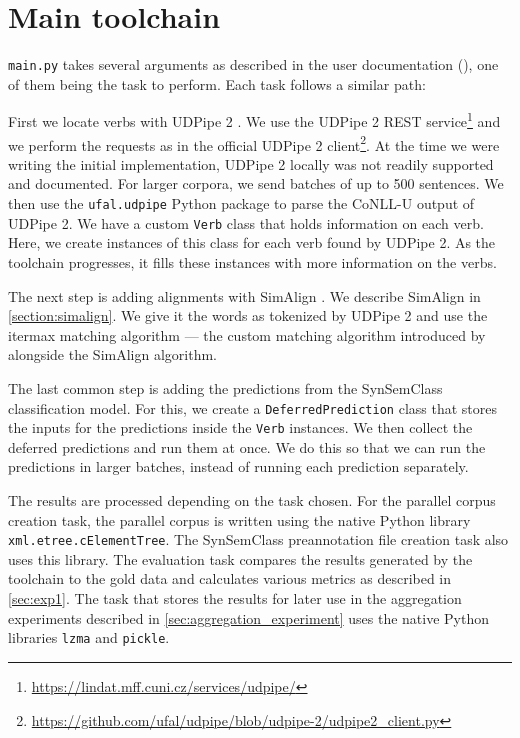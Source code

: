 \section{Main toolchain}

\texttt{main.py} takes several arguments as described in the user documentation (), one of them being the task to perform. Each task follows a similar path:

First we locate verbs with UDPipe 2 \parencite{straka-2018-udpipe}. We use the UDPipe 2 REST service\footnote{\url{https://lindat.mff.cuni.cz/services/udpipe/}} and we perform the requests as in the official UDPipe 2 client\footnote{\url{https://github.com/ufal/udpipe/blob/udpipe-2/udpipe2_client.py}}. At the time we were writing the initial implementation, UDPipe 2 locally was not readily supported and documented. For larger corpora, we send batches of up to 500 sentences. We then use the \texttt{ufal.udpipe} Python package to parse the CoNLL-U output of UDPipe 2. We have a custom \texttt{Verb} class that holds information on each verb. Here, we create instances of this class for each verb found by UDPipe 2. As the toolchain progresses, it fills these instances with more information on the verbs.

The next step is adding alignments with SimAlign \parencite{jalili-sabet-etal-2020-simalign}. We describe SimAlign in \cref{section:simalign}. We give it the words as tokenized by UDPipe 2 and use the itermax matching algorithm --- the custom matching algorithm introduced by \citet{jalili-sabet-etal-2020-simalign} alongside the SimAlign algorithm.

The last common step is adding the predictions from the SynSemClass classification model. For this, we create a \texttt{DeferredPrediction} class that stores the inputs for the predictions inside the \texttt{Verb} instances. We then collect the deferred predictions and run them at once. We do this so that we can run the predictions in larger batches, instead of running each prediction separately.

The results are processed depending on the task chosen. For the parallel corpus creation task, the parallel corpus is written using the native Python library \texttt{xml.etree.cElementTree}. The SynSemClass preannotation file creation task also uses this library. The evaluation task compares the results generated by the toolchain to the gold data and calculates various metrics as described in \cref{sec:exp1}. The task that stores the results for later use in the aggregation experiments described in \cref{sec:aggregation_experiment} uses the native Python libraries \texttt{lzma} and \texttt{pickle}.

